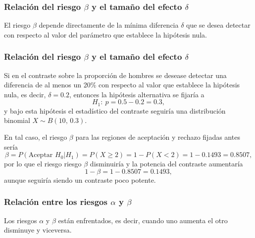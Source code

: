 \begin{frame}
\frametitle{Relación del riesgo $\beta$ y el tamaño del efecto $\delta$}
El riesgo $\beta$ depende directamente de la mínima diferencia $\delta$ que se desea detectar con respecto al valor del
parámetro que establece la hipótesis nula.
\begin{center}
\end{center}
\end{frame}


\begin{frame}
\frametitle{Relación del riesgo $\beta$ y el tamaño del efecto $\delta$}
Si en el contraste sobre la proporción de hombres se desease detectar una diferencia de al menos un 20\% con respecto al valor que establece la hipótesis nula, es decir, $\delta=0.2$, entonces la hipótesis alternativa se fijaría a
\[
H_1:\ p=0.5-0.2=0.3,
\]
y bajo esta hipótesis el estadístico del contraste seguiría una distribución binomial $X\sim B(10,\,0.3)$.

En tal caso, el riesgo $\beta$ para las regiones de aceptación y rechazo fijadas antes sería
\[
\beta = P(\text{Aceptar }H_0|H_1) = P(X\geq 2) = 1 - P(X<2) = 1-0.1493 = 0.8507,
\]
por lo que el riesgo riesgo $\beta$ disminuiría y la potencia del contraste aumentaría
\[
1-\beta = 1-0.8507 = 0.1493,
\]
aunque seguiría siendo un contraste poco potente.
\end{frame}


\begin{frame}
\frametitle{Relación entre los riesgos $\alpha$ y $\beta$}
Los riesgos $\alpha$ y $\beta$ están enfrentados, es decir, cuando uno aumenta el otro disminuye y viceversa.
\begin{center}
\end{center}
\end{frame}



